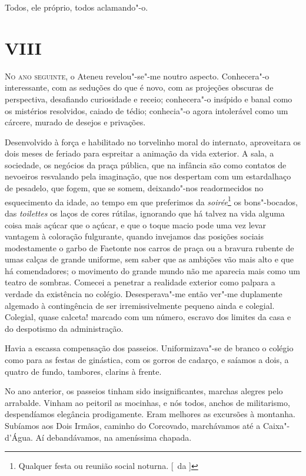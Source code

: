 Todos, ele próprio, todos aclamando"-o. 

\section{VIII}

\noindent\textsc{No ano seguinte}, o Ateneu revelou"-se"-me noutro aspecto.
Conhecera"-o interessante, com as seduções do que é novo, com as
projeções obscuras de perspectiva, desafiando curiosidade e receio;
conhecera"-o insípido e banal como os mistérios resolvidos, caiado de
tédio; conhecia"-o agora intolerável como um cárcere, murado de
desejos e privações. 

Desenvolvido à força e habilitado no torvelinho
moral do internato, aproveitara os dois meses de feriado para espreitar
a animação da vida exterior. A sala, a sociedade, os negócios da praça
pública, que na infância são como contatos de nevoeiros resvalando pela
imaginação, que nos despertam com um estardalhaço de pesadelo, que
fogem, que se somem, deixando"-nos readormecidos no esquecimento da
idade, ao tempo em que preferimos da \textit{soirée}\footnote{ Qualquer festa ou 
reunião social noturna. [~da ]} os bons"-bocados, das
\textit{toilettes} os laços de cores rútilas, ignorando que há talvez na vida
alguma coisa mais açúcar que o açúcar, e que o toque macio pode uma vez
levar vantagem à coloração fulgurante, quando invejamos das posições
sociais modestamente o garbo de Faetonte nos carros de praça ou a
bravura rubente de umas calças de grande uniforme, sem saber que as
ambições vão mais alto e que há comendadores; o movimento do grande
mundo não me aparecia mais como um teatro de sombras. Comecei a
penetrar a realidade exterior como palpara a verdade da existência no
colégio. Desesperava"-me então ver"-me duplamente algemado à
contingência de ser irremissivelmente pequeno ainda e colegial.
Colegial, quase calceta! marcado com um número, escravo dos limites da
casa e do despotismo da administração. 

Havia a escassa compensação dos
passeios. Uniformizava"-se de branco o colégio como para as festas de
ginástica, com os gorros de cadarço, e saíamos a dois, a quatro de
fundo, tambores, clarins à frente. 

No ano anterior, os passeios tinham
sido insignificantes, marchas alegres pelo arrabalde. Vinham ao
peitoril as mocinhas, e nós todos, anchos de militarismo, despendíamos
elegância prodigamente. Eram melhores as excursões à montanha. Subíamos
aos Dois Irmãos, caminho do Corcovado, marchávamos até a
Caixa"-d'Água. Aí debandávamos, na ameníssima chapada. 

